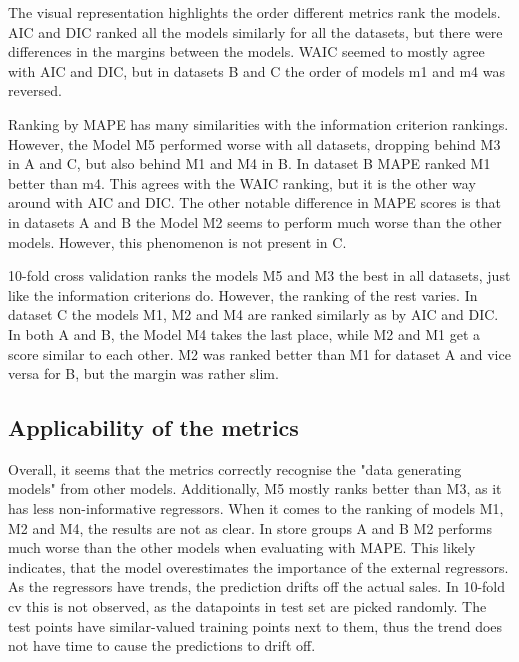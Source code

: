 \documentclass[english, 12pt, a4paper, sci, utf8, a-1b, online]{aaltothesis}
\begin{document}
The visual representation highlights the order different metrics rank the models. AIC and DIC ranked all the models similarly for all the datasets, but there were differences in the margins between the models. WAIC seemed to mostly agree with AIC and DIC, but in datasets B and C the order of models m1 and m4 was reversed. 

Ranking by MAPE has many similarities with the information criterion rankings. However, the Model M5 performed worse with all datasets, dropping behind M3 in A and C, but also behind M1 and M4 in B. In dataset B MAPE ranked M1 better than m4. This agrees with the WAIC ranking, but it is the other way around with AIC and DIC. The other notable difference in MAPE scores is that in datasets A and B the Model M2 seems to perform much worse than the other models. However, this phenomenon is not present in C. 

10-fold cross validation ranks the models M5 and M3 the best in all datasets, just like the information criterions do. However, the ranking of the rest varies. In dataset C the models M1, M2 and M4 are ranked similarly as by AIC and DIC. In both A and B, the Model M4 takes the last place, while M2 and M1 get a score similar to each other. M2 was ranked better than M1 for dataset A and vice versa for B, but the margin was rather slim.


\subsection{Applicability of the metrics}


Overall, it seems that the metrics correctly recognise the "data generating models" from other models. Additionally, M5 mostly ranks better than M3, as it has less non-informative regressors. When it comes to the ranking of models M1, M2 and M4, the results are not as clear. In store groups A and B M2 performs much worse than the other models when evaluating with MAPE. This likely indicates, that the model overestimates the importance of the external regressors. As the regressors have trends, the prediction drifts off the actual sales. In 10-fold cv this is not observed, as the datapoints in test set are picked randomly. The test points have similar-valued training points next to them, thus the trend does not have time to cause the predictions to drift off.
\end{document}
